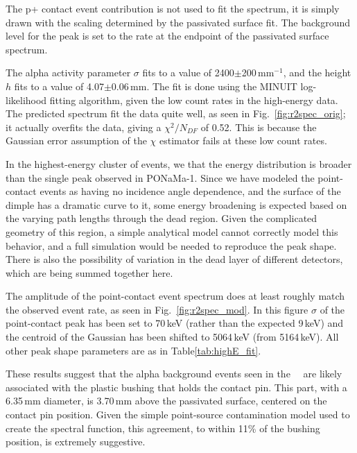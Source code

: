The p+ contact event contribution is not used to fit the spectrum, it is simply drawn with the scaling determined by the passivated surface fit. The background level for the peak is set to the rate at the endpoint of the passivated surface spectrum. 

The alpha activity parameter $\sigma$ fits to a value of 2400$\pm$200\,mm$^{-1}$, and the height $h$ fits to a value of 4.07$\pm$0.06\,mm. The fit is done using the MINUIT log-likelihood fitting algorithm, given the low count rates in the high-energy data.  The predicted spectrum fit the data quite well, as seen in Fig.~\ref{fig:r2spec_orig}; it actually overfits the data, giving a $\chi^2/N_{DF}$ of 0.52. This is because the Gaussian error assumption of the $\chi$ estimator fails at these low count rates. 

In the highest-energy cluster of events, we that the energy distribution is broader than the single peak observed in PONaMa-1. Since we have modeled the point-contact events as having no incidence angle dependence, and the surface of the dimple has a dramatic curve to it, some energy broadening is expected based on the varying path lengths through the dead region. Given the complicated geometry of this region, a simple analytical model cannot correctly model this behavior, and a full simulation would be needed to reproduce the peak shape. There is also the possibility of variation in the dead layer of different detectors, which are being summed together here. 

The amplitude of the point-contact event spectrum does at least roughly match the observed event rate, as seen in Fig.~\ref{fig:r2spec_mod}. In this figure $\sigma$ of the point-contact peak has been set to 70\,keV (rather than the expected 9\,keV) and the centroid of the Gaussian has been shifted to 5064\,keV (from 5164\,keV). All other peak shape parameters are as in Table\ref{tab:highE_fit}. 

These results suggest that the alpha background events seen in the \MJ\ \DEM\ are likely associated with the plastic bushing that holds the contact pin. This part, with a 6.35\,mm diameter, is 3.70\,mm above the passivated surface, centered on the contact pin position. Given the simple point-source contamination model used to create the spectral function, this agreement, to within 11\% of the bushing position, is extremely suggestive.   

